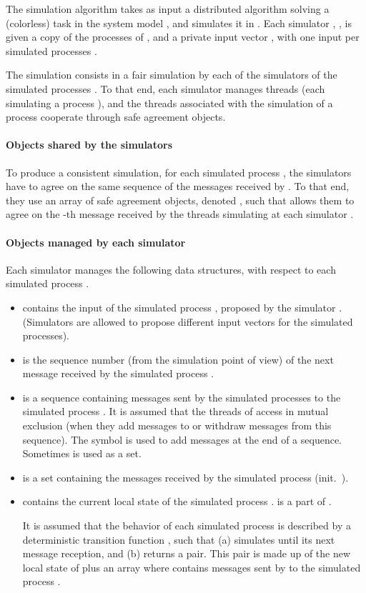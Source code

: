 \documentclass[11pt,letterpaper]{article}
\begin{document}
The simulation algorithm takes as input a distributed algorithm 
solving a (colorless) task in the system model , and
simulates it in  .  Each simulator , ,
is given a copy  of the  processes of , and a private input vector
, with one input per simulated processes .


The simulation consists in a fair simulation by each of the 
simulators  of the  simulated processes .
To that end,  each simulator manages  threads
(each simulating a process ), and the  threads
associated with the simulation of a process  cooperate
through safe agreement objects.


\paragraph{Objects shared by the simulators}
To produce a consistent simulation, for each simulated process ,
the  simulators have to agree on the  same sequence of the messages
received by . To that end, they use an array of safe agreement objects,
denoted , such that   allows them to agree on the
-th message received by the   threads simulating  at each
simulator .

\paragraph{Objects managed by each simulator }
Each simulator manages the following data structures, with respect to each
simulated process .
\begin{itemize}
\vspace{-0.2cm}
\item
 contains the input of the simulated process ,
proposed by the simulator . (Simulators are allowed to propose
different input vectors for the simulated processes).
\vspace{-0.2cm}
\item
 is the sequence number (from the simulation point of view) of the
next message received by the simulated process .
\vspace{-0.2cm}
\item
 is  a sequence containing  messages sent by the simulated
processes  to the simulated process . It is assumed that the 
threads of  access  in mutual exclusion
(when they add messages to or  withdraw  messages from this sequence).
The symbol  is used to add messages at the end of a sequence.
Sometimes  is used as a set.
\vspace{-0.2cm}
\item
 is  a set containing the messages received by the simulated
process  (init.~).
\vspace{-0.2cm}
\item
 contains the current local state of the simulated process
.  is a part of .

It is assumed that the behavior of each simulated process  
is described by a deterministic
transition function , such that  
(a) simulates  until its next message reception, and (b)
returns a pair. This pair is made up of the new local state of  plus
an array  where   contains  messages sent by 
to the simulated process .
\end{itemize}
\end{document}

